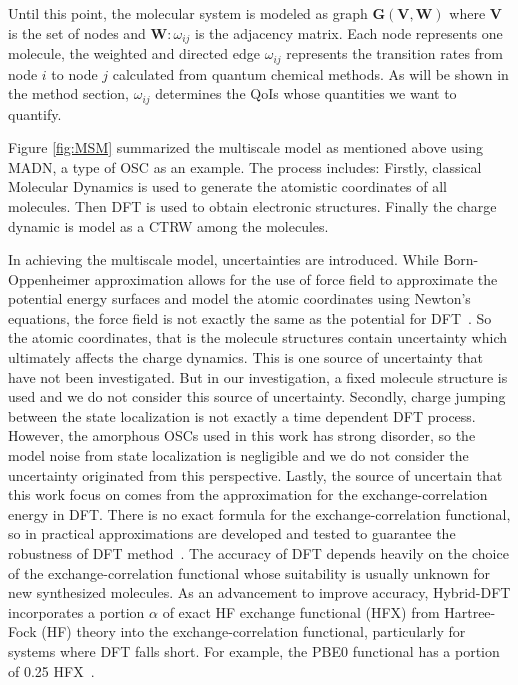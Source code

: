 \documentclass[%
 reprint,
superscriptaddress,
 amsmath,amssymb,
 aps,
prb,
floatfix
]{revtex4-2}
\begin{document}
Until this point, the molecular system is modeled as graph $\mathbf{G}(\mathbf{V}, \mathbf{W})$ where $\mathbf{V}$ is the set of nodes and $\mathbf{W}: \omega_{ij}$ is the adjacency matrix. Each node represents one molecule, the weighted and directed edge $\omega_{ij}$ represents the transition rates from node $i$ to node $j$ calculated from quantum chemical methods. 
As will be shown in the method section, $\omega_{ij}$ determines the QoIs whose quantities we want to quantify.

Figure \ref{fig:MSM} summarized the multiscale model as mentioned above using MADN, a type of OSC as an example. 
The process includes: Firstly, classical Molecular Dynamics is used to generate the atomistic coordinates of all molecules. Then DFT is used to obtain electronic structures. Finally the charge dynamic is model as a CTRW among the molecules.


In achieving the multiscale model, uncertainties are introduced. 
While Born-Oppenheimer approximation allows for the use of force field to approximate the potential energy surfaces and model the atomic coordinates using Newton’s equations, the force field is not exactly the same as the potential for DFT~\cite{izvekov_effective_2004}. 
So the atomic coordinates, that is the molecule structures contain uncertainty which ultimately affects the charge dynamics. 
This is one source of uncertainty that have not been investigated. But in our investigation, a fixed molecule structure is used and we do not consider this source of uncertainty. 
Secondly, charge jumping between the state localization is not exactly a time dependent DFT process. 
However, the amorphous OSCs used in this work has strong disorder, so the model noise from state localization is negligible and we do not consider the uncertainty originated from this perspective.
Lastly, the source of uncertain that this work focus on comes from the approximation for the exchange-correlation energy in DFT. 
There is no exact formula for the exchange-correlation functional, so in practical approximations are developed and tested to guarantee the robustness of DFT method~\cite{gunnarsson_exchange_1976, bilc_hybrid_2008, lee_development_1988}. 
The accuracy of DFT depends heavily on the choice of the exchange-correlation functional whose suitability is usually unknown for new synthesized molecules. 
As an advancement to improve accuracy, Hybrid-DFT \cite{marques_densitybased_2011,perdew_rationale_1996} incorporates a portion $\alpha$ of exact HF exchange functional (HFX) from Hartree-Fock (HF) theory into the exchange-correlation functional, particularly for systems where DFT falls short. For example, the PBE0 functional has a portion of 0.25 HFX~\cite{adamo_toward_1999}.
\end{document}
